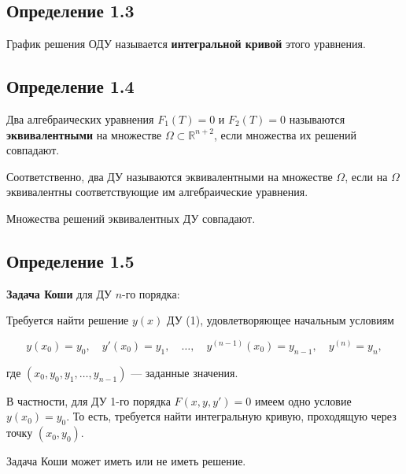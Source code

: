 {	\subsection*{Определение 1.3}

	График решения ОДУ называется \textbf{интегральной кривой} этого уравнения.


	\subsection*{Определение 1.4}

	Два алгебраических уравнения $F_1(T) = 0$ и $F_2(T) = 0$ называются \textbf{эквивалентными} на множестве $\Omega \subset \mathbb{R}^{n+2}$, если множества их решений совпадают.

	Соответственно, два ДУ называются эквивалентными на множестве $\Omega$, если на $\Omega$ эквивалентны соответствующие им алгебраические уравнения.

	Множества решений эквивалентных ДУ совпадают.

	\subsection*{Определение 1.5}

	\textbf{Задача Коши} для ДУ $n$-го порядка:

	Требуется найти решение $y(x)$ ДУ (1), удовлетворяющее начальным условиям


	\[
	y(x_0) = y_0,\quad y'(x_0) = y_1,\quad \ldots,\quad y^{(n-1)}(x_0) = y_{n-1},\quad y^{(n)} = y_n,
	\]


	где $(x_0, y_0, y_1, \ldots, y_{n-1})$ — заданные значения.

	В частности, для ДУ 1-го порядка $F(x, y, y') = 0$ имеем одно условие $y(x_0) = y_0$. То есть, требуется найти интегральную кривую, проходящую через точку $(x_0, y_0)$.

	Задача Коши может иметь или не иметь решение.



	\newpage
}